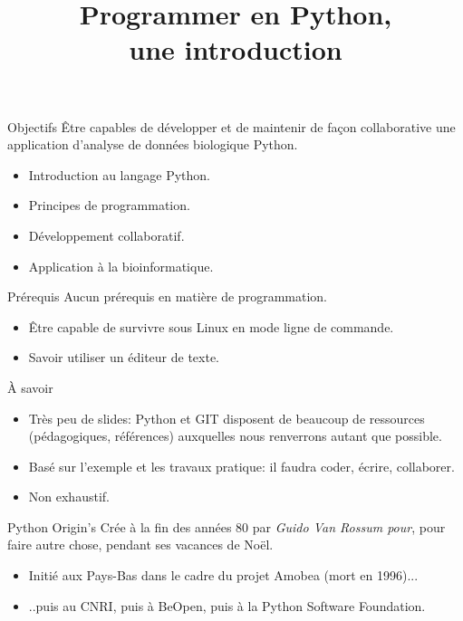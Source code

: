\documentclass{beamer}
\title{Programmer en Python,\\ une introduction}
\begin{document}
\begin{frame}
  \titlepage
\end{frame}

\begin{frame}{Objectifs}
  Être capables de développer et de maintenir de façon collaborative une application d'analyse de données biologique Python.
  
  \begin{itemize}
  \item Introduction au langage Python.
  \item Principes de programmation.
  \item Développement collaboratif.
  \item Application à la bio\-informatique. 
  \end{itemize}
\end{frame}

\begin{frame}{Prérequis}
  Aucun prérequis en matière de programmation.
  
  \begin{itemize}
  \item Être capable de survivre sous Linux en mode ligne de commande.
  \item Savoir utiliser un éditeur de texte.
  \end{itemize}
\end{frame}

\begin{frame}{À savoir}
  \begin{itemize}
  \item Très peu de slides: Python et GIT disposent de beaucoup de ressources (pédagogiques, références) auxquelles nous renverrons autant que possible.
  \item Basé sur l'exemple et les travaux pratique: il faudra coder, écrire, collaborer.
  \item Non exhaustif.
  \end{itemize}
\end{frame}

\begin{frame}{Python Origin's}
  Crée à la fin des années 80 par {\em Guido Van Rossum pour}, pour faire autre chose, pendant ses vacances de Noël.
  \begin{itemize}
  \item Initié aux Pays-Bas dans le cadre du projet Amobea (mort en 1996)...
  \item ..puis au CNRI, puis à BeOpen, puis à la Python Software Foundation.
  \end{itemize}
\end{frame}
\end{document}
